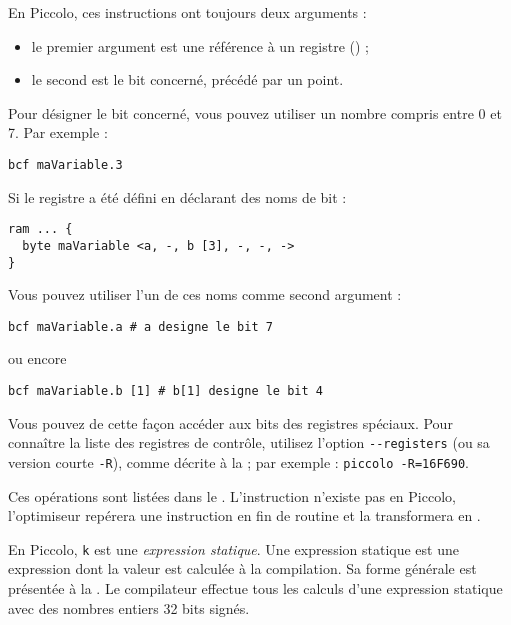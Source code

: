En Piccolo, ces instructions ont toujours deux arguments :
\begin{itemize}
  \item le premier argument est une référence à un registre () ;
  \item le second est le bit concerné, précédé par un point.
\end{itemize}

Pour désigner le bit concerné, vous pouvez utiliser un nombre compris entre 0 et 7. Par exemple :
\begin{lstlisting}[language=piccolo]
bcf maVariable.3
\end{lstlisting}

Si le registre a été défini en déclarant des noms de bit :
\begin{lstlisting}[language=piccolo]
ram ... {
  byte maVariable <a, -, b [3], -, -, ->
}
\end{lstlisting}

Vous pouvez utiliser l’un de ces noms comme second argument :
\begin{lstlisting}[language=piccolo]
bcf maVariable.a # a designe le bit 7
\end{lstlisting}
ou encore
\begin{lstlisting}[language=piccolo]
bcf maVariable.b [1] # b[1] designe le bit 4
\end{lstlisting}

Vous pouvez de cette façon accéder aux bits des registres spéciaux. Pour connaître la liste des registres de contrôle, utilisez l’option \texttt{-{}-registers} (ou sa version courte \texttt{-R}), comme décrite à la  ; par exemple : \texttt{piccolo -R=16F690}.



Ces opérations sont listées dans le . L’instruction  n’existe pas en Piccolo, l’optimiseur repérera une instruction  en fin de routine et la transformera en .

En Piccolo, \texttt{k} est une \emph{expression statique}. Une expression statique est une expression dont la valeur est calculée à la compilation. Sa forme générale est présentée à la . Le compilateur effectue tous les calculs d'une expression statique avec des nombres entiers 32 bits signés.

